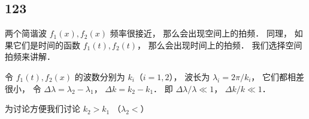 
\begin{issues}
\issueDraft
\end{issues}


\subsection{123}
两个简谐波 $f_1(x), f_2(x)$ 频率很接近， 那么会出现空间上的拍频． 同理， 如果它们是时间的函数 $f_1(t), f_2(t)$， 那么会出现时间上的拍频． 我们选择空间拍频来讲解．


令 $f_1(t), f_2(x)$ 的波数分别为 $k_i$（$i=1,2$）， 波长为 $\lambda_i = 2\pi/k_i$， 它们都相差很小， 令 $\Delta \lambda = \lambda_2 - \lambda_1$， $\Delta k = k_2 - k_1$． 即 $\Delta \lambda/\lambda \ll 1$， $\Delta k/k \ll 1$．

为讨论方便我们讨论 $k_2 > k_1$ （$\lambda_2 < $）
